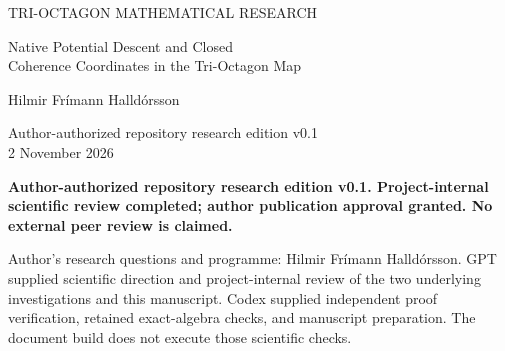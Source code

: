 \documentclass[11pt,a4paper]{article}
\numberwithin{equation}{section}
\theoremstyle{remark}\newtheorem{remark}[theorem]{Remark}
\begin{document}
\hypersetup{pageanchor=false}
\begin{titlepage}
\vspace*{8mm}
{\small\color{MidnightBlue} TRI-OCTAGON MATHEMATICAL RESEARCH\par}
\vspace{8mm}
{\LARGE\bfseries\raggedright Native Potential Descent and Closed\\
Coherence Coordinates in the Tri-Octagon Map\par}
\vspace{8mm}
{\large Hilmir Fr\'imann Halld\'orsson\par}
\vspace{3mm}
{\normalsize Author-authorized repository research edition v0.1\\2 November 2026\par}
\vspace{6mm}
{\small\bfseries Author-authorized repository research edition v0.1. Project-internal scientific review completed; author publication approval granted. No external peer review is claimed.\par}
\vspace{5mm}
\begin{abstract}
The native Tri-Octagon map combines a quartic-potential gradient prestage with simultaneous harmonic-three phase synchronization. We establish two distinct descent statements for its existing potential. On the admitted positive in-phase triad branch with \(g>0\), strict normal stability implies strict local descent modulo common phase. The proof identifies the actual potential Hessian and shows that the triad quotient response contracts this form, even when positive diagonal balance fails. Separately, at a fixed rational coefficient tuple, an inherited invariant domain with amplitudes between \(0.9\) and \(1.1\) and ordinary phase width at most \(\pi/12\) admits the explicit decrease bound \(16869/20000\) times the squared prestage increment. Equality in monotonicity occurs exactly on the unique aligned fixed circle. On that same finite domain, the three intensities and two signed pair areas reconstruct full complex coherence, define an autonomous map on their exact image, and retain every matched edge energy, the potential, and the descent quantity. Two additional real pair entries are minimal within the prescribed raw-entry dictionary; restricting the dictionary to real coherences requires three. Static same-data families prove these lower bounds by failure of current energy retention. The results concern the ideal mathematical recurrence and do not identify the potential with physical energy or reconstruct the discarded common-phase history.
\end{abstract}
\vfill
{\small Author's research questions and programme: Hilmir Fr\'imann Halld\'orsson.
GPT supplied scientific direction and project-internal review of the two underlying investigations and this manuscript.
Codex supplied independent proof verification, retained exact-algebra checks, and manuscript preparation.
The document build does not execute those scientific checks.}
\end{titlepage}
\setcounter{page}{2}
\hypersetup{pageanchor=true}







\appendix


\end{document}
